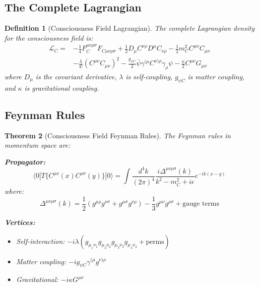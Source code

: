 \documentclass[11pt]{article}
\newtheorem{theorem}{Theorem}[section]
\newtheorem{definition}[theorem]{Definition}
\theoremstyle{definition}
\begin{document}
\subsection{The Complete Lagrangian}

\begin{definition}[Consciousness Field Lagrangian]
The complete Lagrangian density for the consciousness field is:
\begin{align}
\mathcal{L}_C = &-\frac{1}{4}F^{\mu\nu\rho\sigma}_C F_{C\mu\nu\rho\sigma} + \frac{1}{2}D_\mu C^{\nu\rho} D^\mu C_{\nu\rho} - \frac{1}{2}m_C^2 C^{\mu\nu}C_{\mu\nu}\\
&- \frac{\lambda}{4!}(C^{\mu\nu}C_{\mu\nu})^2 - \frac{g_{\psi C}}{2}\bar{\psi}\gamma^{(\mu}C^{\nu)\rho}\gamma_\rho\psi - \frac{\kappa}{2}C^{\mu\nu}G_{\mu\nu}
\end{align}
where $D_\mu$ is the covariant derivative, $\lambda$ is self-coupling, $g_{\psi C}$ is matter coupling, and $\kappa$ is gravitational coupling.
\end{definition}

\subsection{Feynman Rules}

\begin{theorem}[Consciousness Field Feynman Rules]
The Feynman rules in momentum space are:

\textbf{Propagator:}
\begin{equation}
\langle 0|T\{C^{\mu\nu}(x)C^{\rho\sigma}(y)\}|0\rangle = \int \frac{d^4k}{(2\pi)^4} \frac{i\Delta^{\mu\nu\rho\sigma}(k)}{k^2 - m_C^2 + i\epsilon} e^{-ik(x-y)}
\end{equation}
where:
\begin{equation}
\Delta^{\mu\nu\rho\sigma}(k) = \frac{1}{2}(g^{\mu\rho}g^{\nu\sigma} + g^{\mu\sigma}g^{\nu\rho}) - \frac{1}{3}g^{\mu\nu}g^{\rho\sigma} + \text{gauge terms}
\end{equation}

\textbf{Vertices:}
\begin{itemize}
\item Self-interaction: $-i\lambda (g_{\mu_1\nu_1}g_{\mu_2\nu_2}g_{\mu_3\nu_3}g_{\mu_4\nu_4} + \text{perms})$
\item Matter coupling: $-ig_{\psi C}\gamma^{(\mu}g^{\nu)\rho}$
\item Gravitational: $-i\kappa G^{\mu\nu}$
\end{itemize}
\end{theorem}
\end{document}
